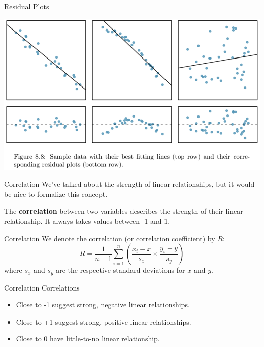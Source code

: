 \begin{frame}{Residual Plots}
    \begin{center}
        \includegraphics[scale=0.3]{images/residplots.png}
    \end{center}
\end{frame}

\begin{frame}{Correlation}
    We've talked about the strength of linear relationships, but it would be nice to formalize this concept.
    
    \vspace{12pt}The \textbf{correlation} between two variables describes the strength of their linear relationship. It always takes values between -1 and 1. 
\end{frame}

\begin{frame}{Correlation}
    We denote the correlation (or correlation coefficient) by $R$:
    \[
        R = \frac{1}{n-1}\sum_{i=1}^{n}\left(\frac{x_i - \bar{x}}{s_x}\times\frac{y_i - \bar{y}}{s_y}\right)
    \]
    where $s_x$ and $s_y$ are the respective standard deviations for $x$ and $y$.
\end{frame}

\begin{frame}{Correlation}
    Correlations
    \begin{itemize}
        \item Close to -1 suggest strong, negative linear relationships.
        \item Close to +1 suggest strong, positive linear relationships.
        \item Close to 0 have little-to-no linear relationship. 
    \end{itemize}
\end{frame}

